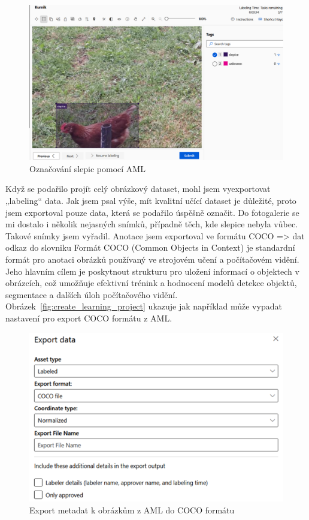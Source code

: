 \begin{figure}[h]
    \centering
    \includegraphics[width=\textwidth]{img/chicken_labeling}
    \caption{Označování slepic pomocí AML}
    \label{fig:chicken_labeling}
\end{figure}

Když se podařilo projít celý obrázkový dataset, mohl jsem vyexportovat „labeling“ data.
Jak jsem psal výše, mít kvalitní učící dataset je důležité, proto jsem exportoval pouze data, která se podařilo úspěšně označit.
Do fotogalerie se mi dostalo i několik nejasných snímků, případně těch, kde slepice nebyla vůbec.
Takové snímky jsem vyřadil.
Anotace jsem exportoval ve formátu COCO => dat odkaz do slovniku
Formát COCO (Common Objects in Context) je standardní formát pro anotaci obrázků používaný ve strojovém učení a počítačovém vidění.
Jeho hlavním cílem je poskytnout strukturu pro uložení informací o objektech v obrázcích, což umožňuje efektivní trénink a hodnocení modelů detekce objektů, segmentace a dalších úloh počítačového vidění.
Obrázek~\ref{fig:create_learning_project} ukazuje jak například může vypadat nastavení pro export COCO formátu z AML.

\begin{figure}[h]
    \centering
    \includegraphics[width=\textwidth]{img/export_coco_format}
    \caption{Export metadat k obrázkům z AML do COCO formátu}
    \label{fig:export_coco_format}
\end{figure}

